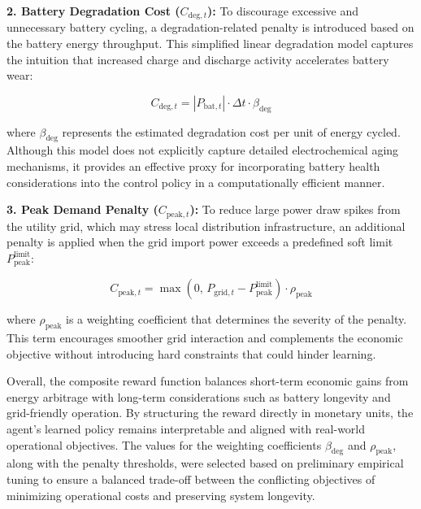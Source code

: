 \textbf{2. Battery Degradation Cost ($C_{\text{deg},t}$):}  
To discourage excessive and unnecessary battery cycling, a degradation-related penalty is introduced based on the battery energy throughput. This simplified linear degradation model captures the intuition that increased charge and discharge activity accelerates battery wear:

\begin{equation}
C_{\text{deg},t} = \left| P_{\text{bat},t} \right| \cdot \Delta t \cdot \beta_{\text{deg}}
\end{equation}

where $\beta_{\text{deg}}$ represents the estimated degradation cost per unit of energy cycled. Although this model does not explicitly capture detailed electrochemical aging mechanisms, it provides an effective proxy for incorporating battery health considerations into the control policy in a computationally efficient manner.

\textbf{3. Peak Demand Penalty ($C_{\text{peak},t}$):}  
To reduce large power draw spikes from the utility grid, which may stress local distribution infrastructure, an additional penalty is applied when the grid import power exceeds a predefined soft limit $P_{\text{peak}}^{\text{limit}}$:

\begin{equation}
C_{\text{peak},t} = \max \left( 0,\, P_{\text{grid},t} - P_{\text{peak}}^{\text{limit}} \right) \cdot \rho_{\text{peak}}
\end{equation}

where $\rho_{\text{peak}}$ is a weighting coefficient that determines the severity of the penalty. This term encourages smoother grid interaction and complements the economic objective without introducing hard constraints that could hinder learning.

Overall, the composite reward function balances short-term economic gains from energy arbitrage with long-term considerations such as battery longevity and grid-friendly operation. By structuring the reward directly in monetary units, the agent’s learned policy remains interpretable and aligned with real-world operational objectives. The values for the weighting coefficients $\beta_{\text{deg}}$ and $\rho_{\text{peak}}$, along with the penalty thresholds, were selected based on preliminary empirical tuning to ensure a balanced trade-off between the conflicting objectives of minimizing operational costs and preserving system longevity.

